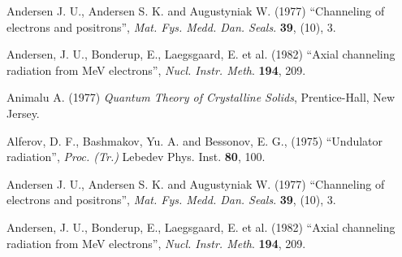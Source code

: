 \begin{thebibliography}{}
Andersen J. U., Andersen S. K. and Augustyniak W.
(1977) ``Channeling of electrons and positrons'', {\it Mat. Fys.
Medd. Dan. Seals}. {\bf 39}, (10), 3.

Andersen, J. U., Bonderup, E., Laegsgaard, E. et
al. (1982) ``Axial channeling radiation from MeV electrons'',
{\it Nucl. Instr. Meth}. {\bf 194}, 209.           

Animalu A. (1977) {\it Quantum Theory of
Crystalline Solids}, Prentice-Hall, New Jersey.

Alferov, D. F., Bashmakov, Yu. A. and Bessonov, E.
G., (1975) ``Undulator radiation'', {\it Proc. (Tr.)} Lebedev
Phys. Inst. {\bf 80}, 100. 

Andersen J. U., Andersen S. K. and Augustyniak W.
(1977) ``Channeling of electrons and positrons'', {\it Mat. Fys.
Medd. Dan. Seals}. {\bf 39}, (10), 3.

Andersen, J. U., Bonderup, E., Laegsgaard, E. et
al. (1982) ``Axial channeling radiation from MeV electrons'',
{\it Nucl. Instr. Meth}. {\bf 194}, 209. 

\end{thebibliography}

